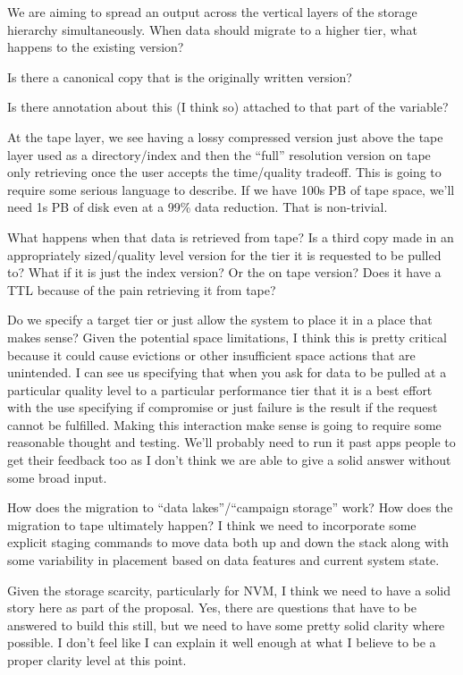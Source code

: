 We are aiming to spread an output across the vertical layers of the storage
hierarchy simultaneously.  When data should migrate to a higher tier, what
happens to the existing version?

Is there a canonical copy that is the originally written version?

Is there annotation about this (I think so) attached to that part of the variable?

At the tape layer, we see having a lossy compressed version just above the tape
layer used as a directory/index and then the ``full'' resolution version on
tape only retrieving once the user accepts the time/quality tradeoff. This is
going to require some serious language to describe. If we have 100s PB of tape
space, we'll need 1s PB of disk even at a 99\% data reduction. That is
non-trivial.

What happens when that data is retrieved from tape? Is a third copy made in an
appropriately sized/quality level version for the tier it is requested to be
pulled to? What if it is just the index version? Or the on tape version? Does
it have a TTL because of the pain retrieving it from tape?

Do we specify a target tier or just allow the system to place it in a place
that makes sense? Given the potential space limitations, I think this is pretty
critical because it could cause evictions or other insufficient space actions
that are unintended. I can see us specifying that when you ask for data to be
pulled at a particular quality level to a particular performance tier that it
is a best effort with the use specifying if compromise or just failure is the
result if the request cannot be fulfilled.  Making this interaction make sense
is going to require some reasonable thought and testing. We'll probably need to
run it past apps people to get their feedback too as I don't think we are able
to give a solid answer without some broad input.

How does the migration to ``data lakes''/``campaign storage'' work? How does the
migration to tape ultimately happen? I think we need to incorporate some
explicit staging commands to move data both up and down the stack along with
some variability in placement based on data features and current system state. 

Given the storage scarcity, particularly for NVM, I think we need to have a
solid story here as part of the proposal. Yes, there are questions that have to
be answered to build this still, but we need to have some pretty solid clarity
where possible. I don't feel like I can explain it well enough at what I
believe to be a proper clarity level at this point.

